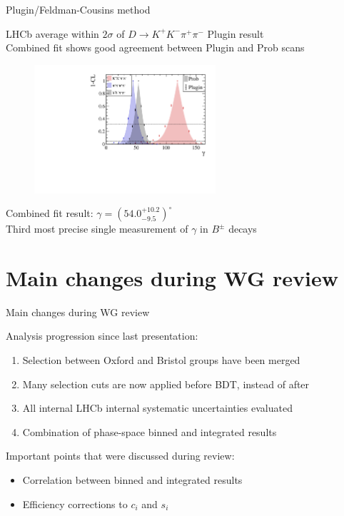 \documentclass[xcolor={dvipsnames}]{beamer}
\begin{document}
\begin{frame}{Plugin/Feldman-Cousins method}
  \begin{center}
    LHCb average within $2\sigma$ of $D\to K^+K^-\pi^+\pi^-$ Plugin result \\
    Combined fit shows good agreement between Plugin and Prob scans
  \end{center}
  \begin{figure}
    \centering
    \includegraphics[width=0.6\textwidth]{Plots/gamma_plugin_scan.pdf}
  \end{figure}
  \vspace{-0.3cm}
  \begin{center}
    Combined fit result: $\gamma = (54.0_{-9.5}^{+10.2})^\circ$ \\
    Third most precise single measurement of $\gamma$ in $B^\pm$ decays
  \end{center}
\end{frame}

\section{Main changes during WG review}
\begin{frame}{Main changes during WG review}
  \begin{center}
    {\Large Analysis progression since last presentation:}
  \end{center}
  \begin{enumerate}
    \setlength\itemsep{0.8em}
    \item{Selection between Oxford and Bristol groups have been merged}
    \item{Many selection cuts are now applied before BDT, instead of after}
    \item{All internal LHCb internal systematic uncertainties evaluated}
    \item{Combination of phase-space binned and integrated results}
  \end{enumerate}
  \vspace{0.3cm}
  \begin{center}
    {\Large Important points that were discussed during review:}
  \end{center}
  \begin{itemize}
    \setlength\itemsep{0.8em}
    \item{Correlation between binned and integrated results}
    \item{Efficiency corrections to $c_i$ and $s_i$}
  \end{itemize}
\end{frame}
\end{document}
